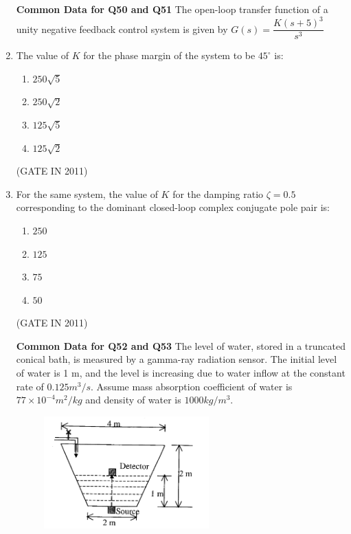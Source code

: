 \documentclass[journal]{IEEEtran}
\begin{document}
\begin{enumerate}
\textbf{Common Data for Q50 and Q51}
The open-loop transfer function of a unity negative feedback control system is given by  
$G(s) = \dfrac{K(s+5)^3}{s^3}$  
\item The value of $K$ for the phase margin of the system to be $45^\circ$ is:
\begin{multicols}{4}
\begin{enumerate}
\item $250\sqrt{5}$  
\item $250\sqrt{2}$  
\item $125\sqrt{5}$  
\item $125\sqrt{2}$
\end{enumerate}
\end{multicols} \hfill(GATE IN 2011)

\item For the same system, the value of $K$ for the damping ratio $\zeta = 0.5$ corresponding to the dominant closed-loop complex conjugate pole pair is:
\begin{multicols}{4}
\begin{enumerate}
\item $250$  
\item $125$  
\item $75$  
\item $50$
\end{enumerate}
\end{multicols} \hfill(GATE IN 2011)

\textbf{Common Data for Q52 and Q53}
The level of water, stored in a truncated conical bath, is measured by a gamma-ray radiation sensor. The initial level of water is 1 m, and the level is increasing due to water inflow at the constant rate of $0.125m^3/s$. Assume mass absorption coefficient of water is $77 \times 10^{-4}  m^2/kg$ and density of water is $1000  kg/m^3$.
\begin{figure}[H]
    \centering
      \includegraphics[width=0.6\textwidth]{18.png} 
      \caption{}
    \label{fig:fig18} 
\end{figure}


\end{enumerate}
\end{document}
